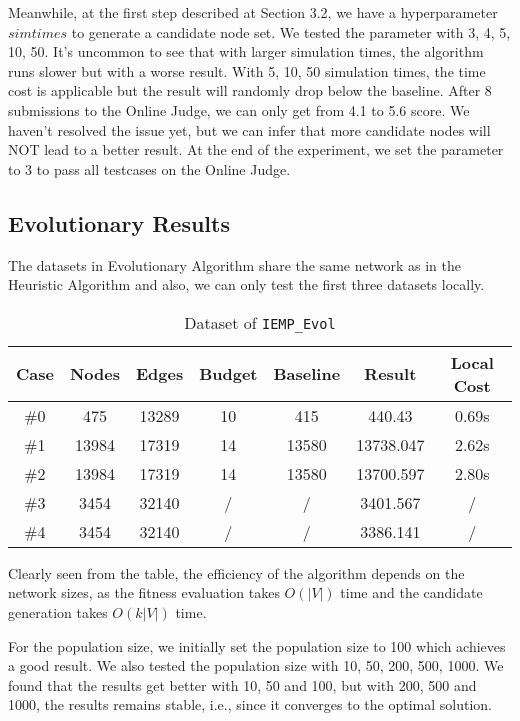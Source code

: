 \documentclass{article}
\begin{document}
Meanwhile, at the first step described at Section 3.2, we have a hyperparameter $simtimes$ to generate a candidate node set. We tested the parameter with 3, 4, 5, 10, 50. It's uncommon to see that with larger simulation times, the algorithm runs slower but with a worse result. With 5, 10, 50 simulation times, the time cost is applicable but the result will randomly drop below the baseline. After 8 submissions to the Online Judge, we can only get from 4.1 to 5.6 score. We haven't resolved the issue yet, but we can infer that more candidate nodes will NOT lead to a better result. At the end of the experiment, we set the parameter to 3 to pass all testcases on the Online Judge.

\subsection{Evolutionary Results}

The datasets in Evolutionary Algorithm share the same network as in the Heuristic Algorithm and also, we can only test the first three datasets locally.

\begin{table}[!htbp]
\setlength{\abovecaptionskip}{+0.2cm}
\setlength{\belowcaptionskip}{+0.2cm}
\centering
\caption{Dataset of \texttt{IEMP\_Evol}}
\begin{tabular}{ccccccc}
\toprule
\textbf{Case} & \textbf{Nodes} & \textbf{Edges} & \textbf{Budget} & \textbf{Baseline} & \textbf{Result} & \textbf{Local Cost} \\ 
\midrule
\#0 & 475 & 13289 & 10 & 415 & 440.43 & 0.69s \\
\#1 & 13984 & 17319 & 14 & 13580 & 13738.047 & 2.62s \\
\#2 & 13984 & 17319 & 14 & 13580 & 13700.597 & 2.80s \\
\#3 & 3454 & 32140 & / & / & 3401.567 & / \\
\#4 & 3454 & 32140 & / & / & 3386.141 & / \\
\bottomrule
\end{tabular}
\end{table}

Clearly seen from the table, the efficiency of the algorithm depends on the network sizes, as the fitness evaluation takes $O(|V|)$ time and the candidate generation takes $O(k|V|)$ time.

For the population size, we initially set the population size to 100 which achieves a good result. We also tested the population size with 10, 50, 200, 500, 1000. We found that the results get better with 10, 50 and 100, but with 200, 500 and 1000, the results remains stable, i.e., since it converges to the optimal solution.
\end{document}
